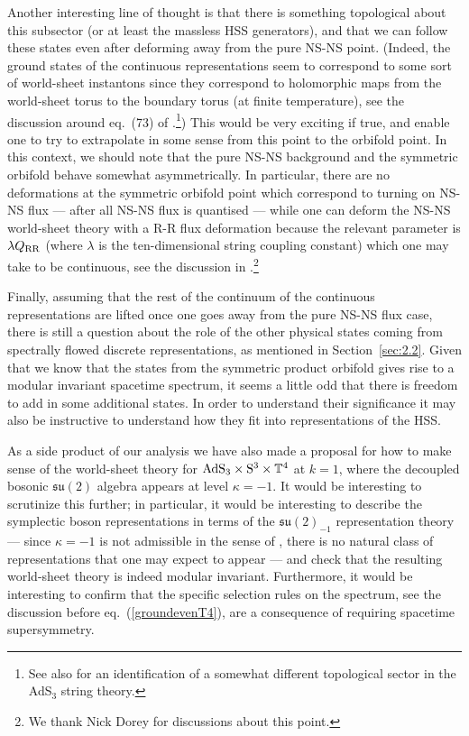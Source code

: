 \documentclass[12pt,a4paper]{article}
\begin{document}
Another interesting line of thought is that there is something topological about this subsector (or at least the massless HSS generators), and that we can follow these states even after deforming away from the pure NS-NS point. (Indeed, the ground states of the continuous representations seem to correspond to some sort of world-sheet instantons since they correspond to holomorphic maps from the world-sheet torus to the boundary torus (at finite temperature), see the discussion around eq.~(73) of \cite{Maldacena:2000kv}.\footnote{See also \cite{Rastelli:2005ph} for an identification of a somewhat different topological sector in the AdS$_3$ string theory.})
This would be very exciting if true, and enable one to try to extrapolate in some sense from this point to the orbifold point. In this context, we should note that the pure NS-NS background and the symmetric orbifold behave somewhat asymmetrically. In particular, there are no deformations at the symmetric orbifold point which correspond to turning on NS-NS flux --- after all NS-NS flux is quantised --- while one can deform the NS-NS world-sheet  theory with a R-R flux deformation because the relevant parameter is $\lambda Q_{\rm RR}$ (where $\lambda$ is the ten-dimensional string coupling constant) which one may take to be continuous, see the discussion in \cite{Berkovits:1999im}.\footnote{We thank Nick Dorey for discussions about this point.}

Finally, assuming that the rest of the continuum of the continuous representations are lifted once one goes away from the pure NS-NS flux case, there is still a question about the role of the other physical states coming from spectrally flowed discrete representations, as mentioned in Section~\ref{sec:2.2}. Given that we know that the states from the symmetric product orbifold gives rise to a modular invariant spacetime spectrum, it seems a little odd that there is freedom to add in some additional states. In order to understand their significance it may also be instructive to understand how they fit into representations of the HSS.
\smallskip

As a side product of our analysis we have also made a proposal for how to make sense of the world-sheet theory for ${\rm AdS}_3\times {\rm S}^3 \times \mathbb{T}^4$ at $k=1$, where the decoupled bosonic $\mathfrak{su}(2)$ algebra appears at level $\kappa=-1$. It would be interesting to scrutinize this further; in particular, it would be interesting to describe the symplectic boson representations in terms of the $\mathfrak{su}(2)_{-1}$ representation theory --- since $\kappa=-1$ is not admissible in the sense of \cite{KW}, there is no natural class of representations that one may expect to appear --- and check that the resulting world-sheet theory is indeed modular invariant. 
Furthermore, it would be interesting to confirm that the specific selection rules on the spectrum, see the discussion before eq.~(\ref{groundevenT4}), are a consequence of requiring spacetime supersymmetry.
\bigskip
\end{document}
